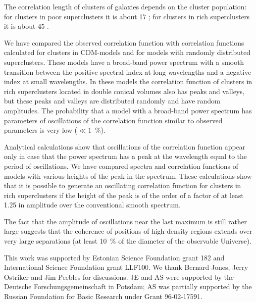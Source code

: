  The correlation length of clusters of galaxies depends on the cluster
population: for clusters in poor superclusters it is about 17 \Mpc; for
clusters in  rich superclusters it is about 45 \Mpc.

We have compared the observed correlation function with correlation
functions calculated for clusters in CDM-models and for models with
randomly distributed superclusters. These models have a broad-band
power spectrum with a smooth transition between the positive spectral
index at long wavelengths and a negative index at small wavelengths.
In these models  the correlation function of clusters in rich
superclusters located in double conical volumes also has peaks and
valleys, but these peaks and valleys are distributed randomly and have
random amplitudes. The probability that a model with a 
broad-band power spectrum has parameters of oscillations of the
correlation function similar to observed parameters is very low 
($\ll 1$~\%).

Analytical calculations show that oscillations of the correlation
function appear only in case that the power spectrum has a peak at the
wavelength equal to the period of oscillations.  We have compared
spectra and correlation functions of models with various heights of
the peak in the spectrum. These calculations show that it is possible
to generate an oscillating correlation function for clusters in
rich superclusters if the height of the peak is of the order of a
factor of at least 1.25 in amplitude over the conventional smooth
spectrum.

The fact that the amplitude of oscillations near the last maximum is
still rather large suggests that the coherence of positions of
high-density regions extends over very large separations (at least
10~\% of the diameter of the observable Universe).



This work was supported by Estonian Science Foundation grant 182 and
International Science Foundation grant LLF100. We thank Bernard Jones,
Jerry Ostriker and Jim Peebles for discussions. JE and AS were
supported by the Deutsche Forschungsgemeinschaft in Potsdam; AS was
partially supported by the Russian Foundation for Basic
Research under Grant 96-02-17591.


